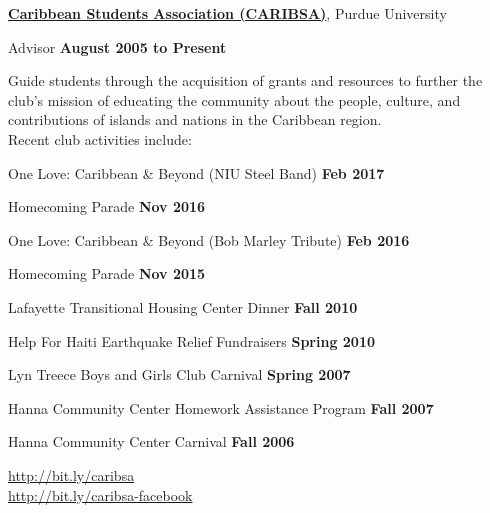 \documentclass[10pt]{article}
\newcommand{\blankline}{\quad\pagebreak[3]}
\begin{document}
    \href{http://bit.ly/caribsa/}{\textbf{Caribbean Students Association (CARIBSA)}}, Purdue University
    \begin{outerlist}

        \item[] Advisor %
                \hfill \textbf{August 2005 to Present}


                Guide students through the acquisition of grants and
                resources to further the club's mission of educating
                the community about the people, culture, and
                contributions of islands and nations in the Caribbean
                region. \\

                Recent club activities include:
                \begin{innerlist}
                    \item One Love: Caribbean \& Beyond (NIU Steel Band) \hfill \textbf{Feb 2017}
                    \item Homecoming Parade  \hfill \textbf{Nov 2016}
                    \item One Love: Caribbean \& Beyond (Bob Marley Tribute) \hfill \textbf{Feb 2016}
                    \item Homecoming Parade  \hfill \textbf{Nov 2015}
                    \item Lafayette Transitional Housing Center Dinner  \hfill \textbf{Fall 2010}
                    \item Help For Haiti Earthquake Relief Fundraisers   \hfill \textbf{Spring 2010}
                    \item Lyn Treece Boys and Girls Club Carnival  \hfill \textbf{Spring 2007}
                    \item Hanna Community Center Homework Assistance Program  \hfill \textbf{Fall 2007}
                    \item Hanna Community Center Carnival  \hfill \textbf{Fall 2006}
                \end{innerlist}

                \url{http://bit.ly/caribsa} \\
                \url{http://bit.ly/caribsa-facebook}

    \end{outerlist}

    \blankline
\end{document}
